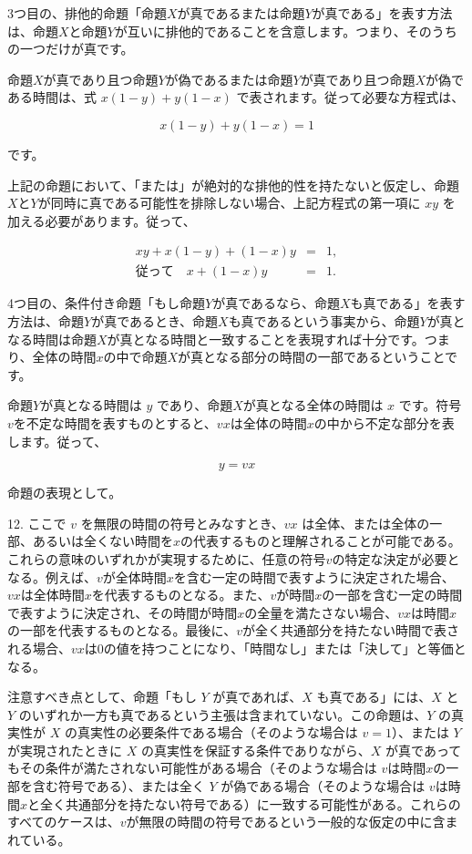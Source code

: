 \documentclass[a4paper,11pt,openany]{ltjsbook}
\begin{document}
3つ目の、排他的命題「命題$X$が真であるまたは命題$Y$が真である」を表す方法は、命題$X$と命題$Y$が互いに排他的であることを含意します。つまり、そのうちの一つだけが真です。

命題$X$が真であり且つ命題$Y$が偽であるまたは命題$Y$が真であり且つ命題$X$が偽である時間は、式 $x(1-y) + y(1-x)$ で表されます。従って必要な方程式は、

\begin{equation}
x(1-y) + y(1-x) = 1
\end{equation}

です。

上記の命題において、「または」が絶対的な排他的性を持たないと仮定し、命題$X$と$Y$が同時に真である可能性を排除しない場合、上記方程式の第一項に $xy$ を加える必要があります。従って、

\begin{eqnarray}
xy + x(1-y) + (1-x)y &=& 1, \nonumber \\
従って \quad x + (1 - x)y &=& 1.
\end{eqnarray}

4つ目の、条件付き命題「もし命題$Y$が真であるなら、命題$X$も真である」を表す方法は、命題$Y$が真であるとき、命題$X$も真であるという事実から、命題$Y$が真となる時間は命題$X$が真となる時間と一致することを表現すれば十分です。つまり、全体の時間$x$の中で命題$X$が真となる部分の時間の一部であるということです。

命題$Y$が真となる時間は $y$ であり、命題$X$が真となる全体の時間は $x$ です。符号$v$を不定な時間を表すものとすると、$vx$は全体の時間$x$の中から不定な部分を表します。従って、

\[
y = vx
\]

命題の表現として。

12. ここで $v$ を無限の時間の符号とみなすとき、$vx$ は全体、または全体の一部、あるいは全くない時間を$x$の代表するものと理解されることが可能である。これらの意味のいずれかが実現するために、任意の符号$v$の特定な決定が必要となる。例えば、$v$が全体時間$x$を含む一定の時間で表すように決定された場合、$vx$は全体時間$x$を代表するものとなる。また、$v$が時間$x$の一部を含む一定の時間で表すように決定され、その時間が時間$x$の全量を満たさない場合、$vx$は時間$x$の一部を代表するものとなる。最後に、$v$が全く共通部分を持たない時間で表される場合、$vx$は0の値を持つことになり、「時間なし」または「決して」と等価となる。

注意すべき点として、命題「もし $Y$ が真であれば、$X$ も真である」には、$X$ と $Y$ のいずれか一方も真であるという主張は含まれていない。この命題は、$Y$ の真実性が $X$ の真実性の必要条件である場合（そのような場合は $v=1$）、または $Y$ が実現されたときに $X$ の真実性を保証する条件でありながら、$X$ が真であってもその条件が満たされない可能性がある場合（そのような場合は $v$は時間$x$の一部を含む符号である）、または全く $Y$ が偽である場合（そのような場合は $v$は時間$x$と全く共通部分を持たない符号である）に一致する可能性がある。これらのすべてのケースは、$v$が無限の時間の符号であるという一般的な仮定の中に含まれている。
\end{document}
